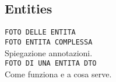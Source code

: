 \subsection{Entities}

\texttt{FOTO DELLE ENTITA}\\

\noindent \texttt{FOTO ENTITA COMPLESSA}\\

\noindent Spiegazione annotazioni.\\

\noindent \texttt{FOTO DI UNA ENTITA DTO}\\

\noindent Come funziona e a cosa serve.\\